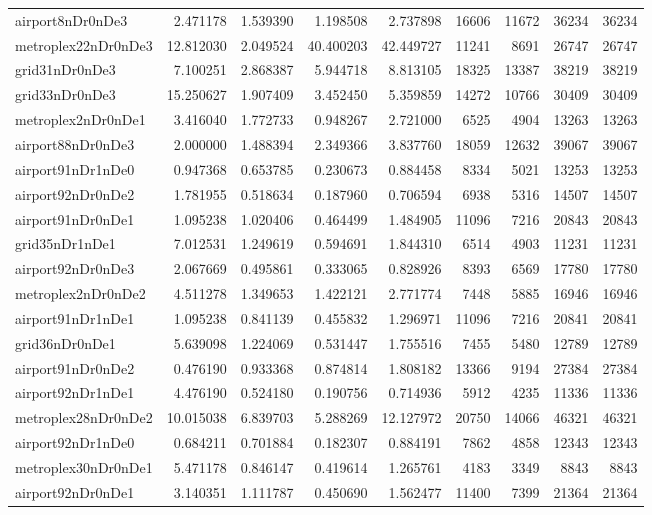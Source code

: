 \begin{longtable}{|l|r|r|r|r|r|r|r|r|}
airport8nDr0nDe3 & 2.471178 & 1.539390 & 1.198508 & 2.737898 & 16606 & 11672 & 36234 & 36234 \\
metroplex22nDr0nDe3 & 12.812030 & 2.049524 & 40.400203 & 42.449727 & 11241 & 8691 & 26747 & 26747 \\
grid31nDr0nDe3 & 7.100251 & 2.868387 & 5.944718 & 8.813105 & 18325 & 13387 & 38219 & 38219 \\
grid33nDr0nDe3 & 15.250627 & 1.907409 & 3.452450 & 5.359859 & 14272 & 10766 & 30409 & 30409 \\
metroplex2nDr0nDe1 & 3.416040 & 1.772733 & 0.948267 & 2.721000 & 6525 & 4904 & 13263 & 13263 \\
airport88nDr0nDe3 & 2.000000 & 1.488394 & 2.349366 & 3.837760 & 18059 & 12632 & 39067 & 39067 \\
airport91nDr1nDe0 & 0.947368 & 0.653785 & 0.230673 & 0.884458 & 8334 & 5021 & 13253 & 13253 \\
airport92nDr0nDe2 & 1.781955 & 0.518634 & 0.187960 & 0.706594 & 6938 & 5316 & 14507 & 14507 \\
airport91nDr0nDe1 & 1.095238 & 1.020406 & 0.464499 & 1.484905 & 11096 & 7216 & 20843 & 20843 \\
grid35nDr1nDe1 & 7.012531 & 1.249619 & 0.594691 & 1.844310 & 6514 & 4903 & 11231 & 11231 \\
airport92nDr0nDe3 & 2.067669 & 0.495861 & 0.333065 & 0.828926 & 8393 & 6569 & 17780 & 17780 \\
metroplex2nDr0nDe2 & 4.511278 & 1.349653 & 1.422121 & 2.771774 & 7448 & 5885 & 16946 & 16946 \\
airport91nDr1nDe1 & 1.095238 & 0.841139 & 0.455832 & 1.296971 & 11096 & 7216 & 20841 & 20841 \\
grid36nDr0nDe1 & 5.639098 & 1.224069 & 0.531447 & 1.755516 & 7455 & 5480 & 12789 & 12789 \\
airport91nDr0nDe2 & 0.476190 & 0.933368 & 0.874814 & 1.808182 & 13366 & 9194 & 27384 & 27384 \\
airport92nDr1nDe1 & 4.476190 & 0.524180 & 0.190756 & 0.714936 & 5912 & 4235 & 11336 & 11336 \\
metroplex28nDr0nDe2 & 10.015038 & 6.839703 & 5.288269 & 12.127972 & 20750 & 14066 & 46321 & 46321 \\
airport92nDr1nDe0 & 0.684211 & 0.701884 & 0.182307 & 0.884191 & 7862 & 4858 & 12343 & 12343 \\
metroplex30nDr0nDe1 & 5.471178 & 0.846147 & 0.419614 & 1.265761 & 4183 & 3349 & 8843 & 8843 \\
airport92nDr0nDe1 & 3.140351 & 1.111787 & 0.450690 & 1.562477 & 11400 & 7399 & 21364 & 21364 \\

\end{longtable}
